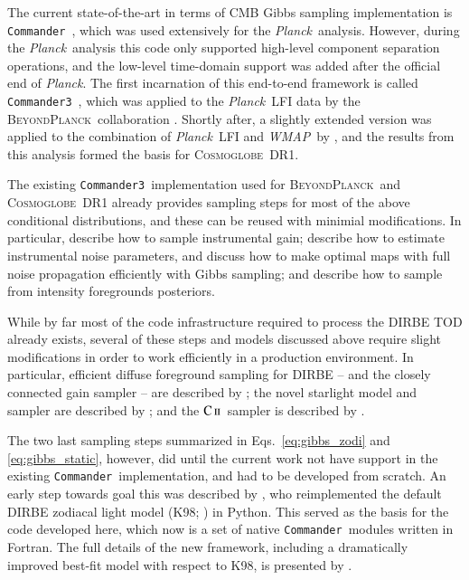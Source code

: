 \documentclass{aa}
\def\Cosmoglobe{\textsc{Cosmoglobe}}
\def\commanderthree{\texttt{Commander3}}
\def\commander{\texttt{Commander}}
\def\Planck{\textit{Planck}}
\def\WMAP{\textit{WMAP}}
\newcommand{\CII}{\ensuremath{\textsc{C\,ii}}}
\newcommand{\BP}{\textsc{BeyondPlanck}}
\begin{document}
The current state-of-the-art in terms of CMB Gibbs sampling
implementation is \commander\ \citep{Eriksen:2004ss}, which was used
extensively for the \Planck\ analysis. However, during the
\Planck\ analysis this code only supported high-level component
separation operations, and the low-level time-domain support was added
after the official end of \Planck. The first incarnation of this
end-to-end framework is called \commanderthree\ \citep{bp03}, which
was applied to the \Planck\ LFI data by the \BP\ collaboration
\citep{bp01}. Shortly after, a slightly extended version was applied
to the combination of \Planck\ LFI and \WMAP\ by
\citet{watts2023_dr1}, and the results from this analysis formed the
basis for \Cosmoglobe\ DR1. 

The existing \commanderthree\ implementation used for \BP\ and
\Cosmoglobe\ DR1 already provides sampling steps for most of the above
conditional distributions, and these can be reused with minimial
modifications. In particular, \citet{bp07} describe how to sample
instrumental gain; \citet{bp06} describe how to estimate instrumental
noise parameters, and \citet{bp02} discuss how to make optimal maps
with full noise propagation efficiently with Gibbs sampling; and
\citet{bp13} describe how to sample from intensity foregrounds
posteriors. 

While by far most of the code infrastructure required to process the
DIRBE TOD already exists, several of these steps and models discussed
above require slight modifications in order to work efficiently in a
production environment. In particular, efficient diffuse foreground
sampling for DIRBE -- and the closely connected gain sampler -- are
described by \citet{CG02_05}; the novel starlight model and sampler
are described by \citet{CG02_04}; and the \CII\ sampler is described
by \citet{CG02_06}. 

The two last sampling steps summarized in Eqs.~\eqref{eq:gibbs_zodi}
and \eqref{eq:gibbs_static}, however, did until the current work not
have support in the existing \commander\ implementation, and had to be
developed from scratch. An early step towards goal this was described
by \citet{san:2022}, who reimplemented the default DIRBE zodiacal
light model (K98; \citealp{kelsall1998}) in Python. This served as the
basis for the code developed here, which now is a set of native
\commander\ modules written in Fortran. The full details of the new
framework, including a dramatically improved best-fit model with
respect to K98, is presented by \citet{CG02_02}.
\end{document}
